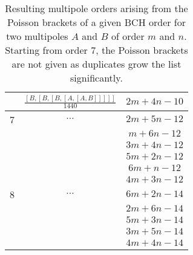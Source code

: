 \begin{table}[H]
\begin{tabular}{ccc}
        & $\frac{\left[B,\left[B,\left[B,\left[A,\left[A,B\right]\right]\right]\right]\right]}{1440}$ & $2 m + 4 n - 10$ \\
      \midrule
      7 & $\cdots$ & $2m + 5n - 12$ \\
        &  & $m + 6n - 12$ \\
        &  & $3m + 4n - 12$ \\
        &  & $5m + 2n - 12$ \\
        &  & $6m + n - 12$ \\
        &  & $4m + 3n - 12$ \\
      \midrule
      8 & $\cdots$ & $6m + 2n - 14$ \\
        &  & $2m + 6n - 14$ \\
        &  & $5m + 3n - 14$ \\
        &  & $3m + 5n - 14$ \\
        &  & $4m + 4n - 14$ \\
      \bottomrule
  \end{tabular}
  \caption{Resulting multipole orders arising from the Poisson brackets of a given BCH order for two
  multipoles $A$ and $B$ of order $m$ and $n$. Starting from order 7, the Poisson brackets are not
  given as duplicates grow the list significantly.}
  \label{table:appendix:transfer_maps:bch_resulting_orders}
\end{table}


